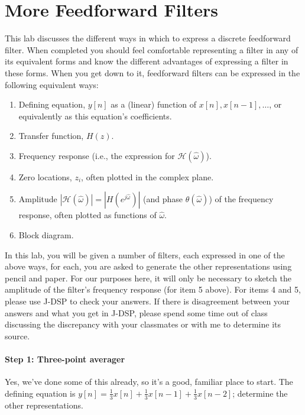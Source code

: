
\section{More Feedforward Filters}

This lab discusses the different ways in which to express a discrete
feedforward filter. When completed you should feel comfortable
representing a filter in any of its equivalent forms and know the
different advantages of expressing a filter in these forms.  When you
get down to it, feedforward filters can be expressed in the following
equivalent ways:
\begin{enumerate}
\item Defining equation, $y[n]$ as a (linear) function of $x[n],
  x[n-1], \ldots$, or equivalently as this equation's coefficients.
\item Transfer function, $H(z)$.
\item Frequency response (i.e., the expression for $\mathcal{H}(\hat{\omega})$). 
\item Zero locations, $z_i$, often plotted in the complex plane.
\item Amplitude $|\mathcal{H}(\hat{\omega})| = |H(e^{j\hat{\omega}})|$ (and phase
  $\theta(\hat{\omega})$) of the frequency response, often plotted as
  functions of $\hat{\omega}$.
\item Block diagram.
\end{enumerate}

In this lab, you will be given a number of filters, each expressed in
one of the above ways, for each, you are asked to generate the other
representations using pencil and paper. For our purposes here, it will
only be necessary to sketch the amplitude of the filter's frequency
response (for item 5 above).  For items 4 and 5, please use J-DSP to
check your answers. If there is disagreement between your answers and
what you get in J-DSP, please spend some time out of class discussing
the discrepancy with your classmates or with me to determine its
source.

\paragraph{Step 1: Three-point averager} Yes, we've done some of this already,
	so it's a good, familiar place to start. The defining equation is
	$y[n] = \frac{1}{3}x[n] + \frac{1}{3}x[n-1] + \frac{1}{3}x[n-2]$;
	determine the other representations.
	

